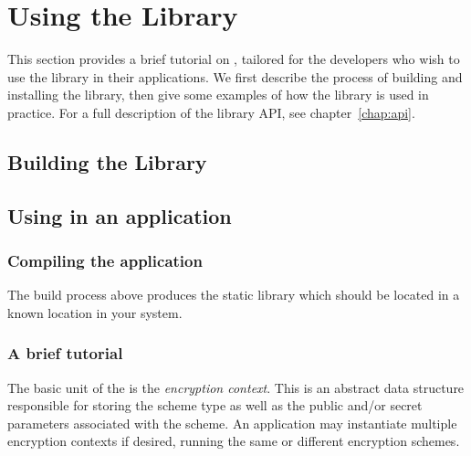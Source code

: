 \chapter{Using the Library}

\newcommand{\fenccontext}{fenc\_context}
\newcommand{\fencglobalparams}{fenc\_global\_params}
\newcommand{\fencerror}{FENC\_ERROR}
\newcommand{\fencerrornone}{FENC\_ERROR\_NONE}
\newcommand{\fencschemeLSW}{FENC\_SCHEME\_LSW}
\newcommand{\libfencinitialize}{libfenc\_init}
\newcommand{\libfencerrortostring}{libfenc\_error\_to\_string}
\newcommand{\libfenccreatecontext}{libfenc\_create\_context}
\newcommand{\libfencgenparams}{libfenc\_gen\_params}


This section provides a brief tutorial on {\libraryshort}, tailored for the developers who wish to use the library in their applications.  We first describe the process of building and installing the library, then give some examples of how the library is used in practice.  For a full description of the library API, see chapter~\ref{chap:api}.

\section{Building the Library}

\section{Using {\libraryshort} in an application}

\subsection{Compiling the application}

The build process above produces the static library {\libraryunixlib} which should be located in a known location in your system.  

\subsection{A brief tutorial}
\label{sec:tutorial}

The basic unit of the {\libraryname} is the {\em encryption context}.  This is an abstract data structure responsible for storing the scheme type as well as the public and/or secret parameters associated with the scheme.  An application may instantiate multiple encryption contexts if desired, running the same or different encryption schemes.


